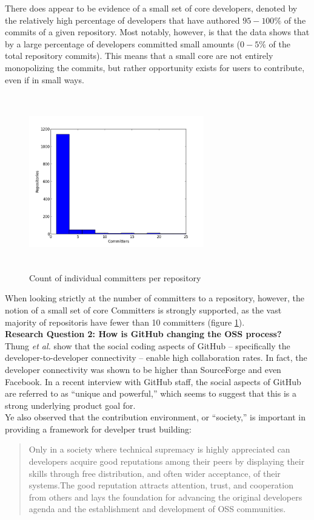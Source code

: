 \documentclass{proc}
\begin{document}
There does appear to be evidence of a small set of core developers, denoted by the relatively high percentage of developers that have authored $95-100\%$ of the commits of a given repository. Most notably, however, is that the data shows that by a large percentage of developers committed small amounts ($0-5\%$ of the total repository commits). This means that a small core are not entirely monopolizing the commits, but rather opportunity exists for users to contribute, even if in small ways.

\begin{figure}
\includegraphics[height=3in,width=3in]{images/committers_histogram.png}
\caption{Count of individual committers per repository}
\label{fig:committers_histogram}
\end{figure}

When looking strictly at the number of committers to a repository, however, the notion of a small set of core Committers is strongly supported, as the vast majority of repositoris have fewer than 10 committers (figure \ref{fig:committers_histogram}).\\

\textbf{Research Question 2: How is GitHub changing the OSS process?}\\
Thung \textit{et al.} show that the social coding aspects of GitHub -- specifically the developer-to-developer connectivity -- enable high collaboration rates.\cite{thung2013network} In fact, the developer connectivity was shown to be higher than SourceForge and even Facebook. In a recent interview with GitHub staff, the social aspects of GitHub are referred to as ``unique and powerful\cite{begel2013social},'' which seems to suggest that this is a strong underlying product goal for.\\

Ye also observed\cite{ye2003toward} that the contribution environment, or ``society,'' is important in providing a framework for develper trust building:
\begin{quote}
Only in a society where technical supremacy is highly appreciated can developers acquire good reputations among their peers by displaying their skills through free distribution, and often wider acceptance, of their systems.The good reputation attracts attention, trust, and cooperation from others and lays the foundation for advancing the original developers agenda and the establishment and development of OSS communities. 
\end{quote}
\end{document}
